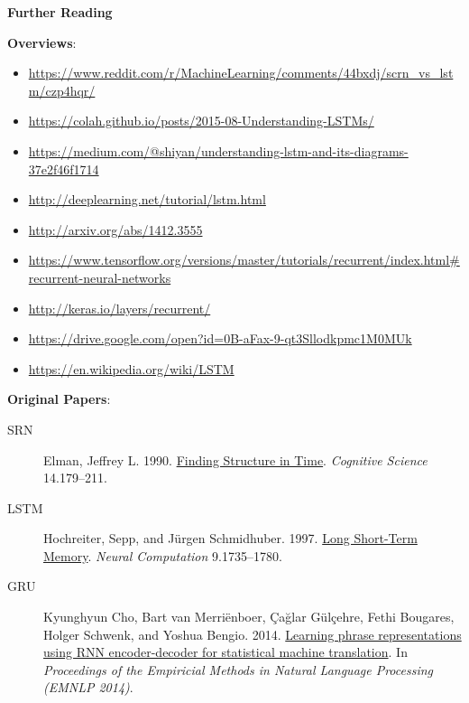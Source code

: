 \documentclass{beamer}
\newcommand{\pagestepalt}[2]{
  \begin{frame}[t]
    \begin{minipage}[t][0.26\textheight][t]{\textwidth}
      \begin{center}
        \huge
        \textbf{#1}
      \end{center}
    \end{minipage}
    
    \begin{minipage}[t][0.7\textheight][c]{\textwidth}
      #2
    \end{minipage}
  \end{frame}
}
\begin{document}
\pagestepalt{Further Reading}{
\vspace{-1ex}
\textbf{Overviews}: \\[0.5em]
\begin{minipage}{1.1\textwidth}
\begin{tiny}
\begin{itemize}
	\item \url{https://www.reddit.com/r/MachineLearning/comments/44bxdj/scrn\_vs\_lstm/czp4hqr/}
	\item \url{https://colah.github.io/posts/2015-08-Understanding-LSTMs/}
	\item \url{https://medium.com/@shiyan/understanding-lstm-and-its-diagrams-37e2f46f1714}
	\item \url{http://deeplearning.net/tutorial/lstm.html}
	\item \url{http://arxiv.org/abs/1412.3555}
	\item \url{https://www.tensorflow.org/versions/master/tutorials/recurrent/index.html\#recurrent-neural-networks}
	\item \url{http://keras.io/layers/recurrent/}
	\item \url{https://drive.google.com/open?id=0B-aFax-9-qt3Sllodkpmc1M0MUk}
	\item \url{https://en.wikipedia.org/wiki/LSTM}
\end{itemize}
\end{tiny}
\end{minipage}

\vspace{0.5em}
\textbf{Original Papers}:
\begin{tiny}
\begin{description}
	\item[SRN] Elman, Jeffrey L. 1990. \href{http://citeseerx.ist.psu.edu/viewdoc/summary?doi=10.1.1.28.9476}{Finding Structure in Time}. \textit{Cognitive Science} 14.179--211.
	\item[LSTM] Hochreiter, Sepp, and J\"{u}rgen Schmidhuber. 1997. \href{http://deeplearning.cs.cmu.edu/pdfs/Hochreiter97_lstm.pdf}{Long Short-Term Memory}. \textit{Neural Computation} 9.1735--1780.
	\item[GRU] Kyunghyun Cho, Bart van Merri\"{e}nboer, \c{C}a\u{g}lar G\"{u}l\c{c}ehre, Fethi Bougares, Holger Schwenk, and Yoshua Bengio. 2014. \href{https://arxiv.org/abs/1406.1078}{Learning phrase representations using RNN encoder-decoder for statistical machine translation}. In \textit{Proceedings of the Empiricial Methods in Natural Language Processing (EMNLP 2014)}.
\end{description}
\end{tiny}
}
\end{document}
